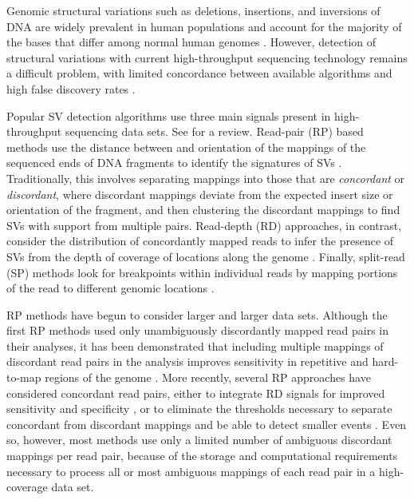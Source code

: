 \documentclass[11pt]{article}
\begin{document}
Genomic structural variations such as deletions, insertions, and inversions of DNA are widely prevalent in human populations and account for the majority of the bases that differ among normal human genomes \autocite{Mills:2011p1611, Conrad:2010ja}. However, detection of structural variations with current high-throughput sequencing technology remains a difficult problem, with limited concordance between available algorithms and high false discovery rates \autocite{Mills:2011p1611}.

Popular SV detection algorithms use three main signals present in high-throughput sequencing data sets. See \textcite{Alkan:2011p547} for a review. Read-pair (RP) based methods use the distance between and orientation of the mappings of the sequenced ends of DNA fragments to identify the signatures of SVs \autocite{Campbell:2008p539,Chen:2009p3,Hormozdiari:2009p284,Sindi:2009gu,Korbel:2009dy}. Traditionally, this involves separating mappings into those that are \emph{concordant} or \emph{discordant}, where discordant mappings deviate from the expected insert size or orientation of the fragment, and then clustering the discordant mappings to find SVs with support from multiple pairs. Read-depth (RD) approaches, in contrast, consider the distribution of concordantly mapped reads to infer the presence of SVs from the depth of coverage of locations along the genome \autocite{Abyzov:2011bk,Alkan:2009cr,Yoon:2009kb,Chiang:2009di}. Finally, split-read (SP) methods look for breakpoints within individual reads by mapping portions of the read to different genomic locations \autocite{Wang:2011p1607,Ye:2009p2}.

RP methods have begun to consider larger and larger data sets. Although the first RP methods used only unambiguously discordantly mapped read pairs in their analyses, it has been demonstrated that including multiple mappings of discordant read pairs in the analysis improves sensitivity in repetitive and hard-to-map regions of the genome \autocite{Hormozdiari:2009p284,Quinlan:2010gf}. More recently, several RP approaches have considered concordant read pairs, either to integrate RD signals for improved sensitivity and specificity \autocite{Sindi:2012kk,Michaelson:2012fj,Chiara:2012ey}, or to eliminate the thresholds necessary to separate concordant from discordant mappings and be able to detect smaller events \autocite{Marschall:2012ek}. Even so, however, most methods use only a limited number of ambiguous discordant mappings per read pair, because of the storage and computational requirements necessary to process all or most ambiguous mappings of each read pair in a high-coverage data set.
\end{document}
